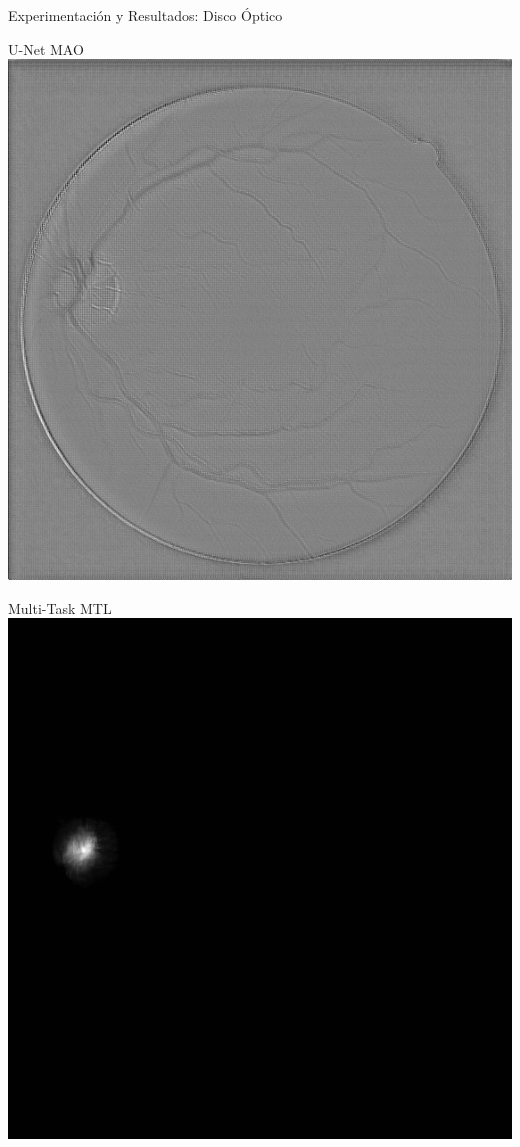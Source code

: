 \documentclass[xcolor=dvipsnames,table]{beamer}
\begin{document}
\begin{frame}{Experimentación y Resultados: Disco Óptico}
\begin{minipage}[b]{0.13\textwidth}
	\end{minipage}\hfill
	\begin{minipage}[b]{0.13\textwidth}
		\centering
		U-Net MAO\\[0.2cm]
		\includegraphics[width=\linewidth]{my_images/video/ODUNETMAO.jpg}
	\end{minipage}\hfill
	\begin{minipage}[b]{0.13\textwidth}
		\centering
		Multi-Task MTL\\[0.2cm]
		\includegraphics[width=\linewidth]{my_images/video/ODTASKMTL.jpg}

\end{minipage}
\end{frame}
\end{document}
